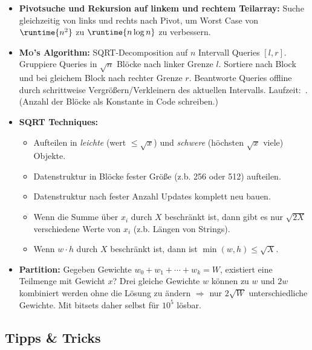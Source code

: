 \begin{itemize}
	\item \textbf{Pivotsuche und Rekursion auf linkem und rechtem Teilarray:}
	Suche gleichzeitig von links und rechts nach Pivot, um Worst Case von
	$\runtime{n^2}$ zu $\runtime{n\log n}$ zu verbessern.
	
	\item \textbf{\textsc{Mo}'s Algorithm:}
	SQRT-Decomposition auf $n$ Intervall Queries $[l,r]$.
	Gruppiere Queries in $\sqrt{n}$ Blöcke nach linker Grenze $l$.
	Sortiere nach Block und bei gleichem Block nach rechter Grenze $r$.
	Beantworte Queries offline durch schrittweise Vergrößern/Verkleinern des aktuellen Intervalls.
	Laufzeit:~.
	(Anzahl der Blöcke als Konstante in Code schreiben.)
	
	\item \textbf{SQRT Techniques:}
	\begin{itemize}
		\item Aufteilen in \emph{leichte} (wert $\leq\sqrt{x}$) und \emph{schwere} (höchsten $\sqrt{x}$ viele) Objekte.
		\item Datenstruktur in Blöcke fester Größe (z.b. 256 oder 512) aufteilen.
		\item Datenstruktur nach fester Anzahl Updates komplett neu bauen.
		\item Wenn die Summe über $x_i$ durch $X$ beschränkt ist, dann gibt es nur $\sqrt{2X}$ verschiedene Werte von $x_i$ (z.b. Längen von Strings).
		\item Wenn $w\cdot h$ durch $X$ beschränkt ist, dann ist $\min(w,h)\leq\sqrt{X}$.
	\end{itemize}

	\item \textbf{Partition:}
	Gegeben Gewichte $w_0+w_1+\cdots+w_k=W$, existiert eine Teilmenge mit Gewicht $x$?
	Drei gleiche Gewichte $w$ können zu $w$ und $2w$ kombiniert werden ohne die Lösung zu ändern $\Rightarrow$ nur $2\sqrt{W}$ unterschiedliche Gewichte.
	Mit bitsets daher selbst für $10^5$ lösbar.
\end{itemize}

\subsection{Tipps \& Tricks}

